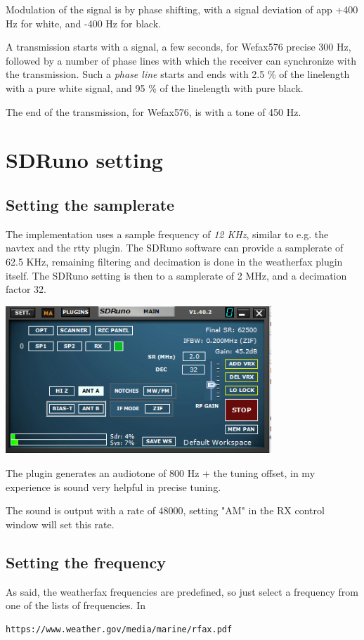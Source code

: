 \documentclass[11pt]{article}
\begin{document}
Modulation of the signal is by phase shifting, with a signal deviation of
app  +400 Hz for white, and -400 Hz for black.

A transmission starts with a signal, a few seconds, for Wefax576
precise 300 Hz,
followed by a number of phase lines with which the receiver can synchronize
with the transmission.
Such a {\em phase line} starts and ends with 2.5 \% of the linelength
with a pure white signal, and 95 \% of the linelength with pure black.

The end of the transmission, for Wefax576, is with a tone of 450 Hz.

\section{SDRuno setting}
\subsection{Setting the samplerate}
The implementation uses a sample frequency of {\em 12 KHz},
similar to e.g. the navtex and the rtty plugin.
The SDRuno software can provide a samplerate
of 62.5 KHz, remaining filtering and decimation is done in
the weatherfax plugin itself.
The SDRuno setting is then to a samplerate of 2 MHz, and a decimation factor
32.

\includegraphics[width=100mm]{main-widget.png}

The plugin generates an audiotone of 800 Hz + the tuning offset, in my
experience is sound very helpful in precise tuning.

The sound is output with a rate of 48000, setting "AM" in the RX control window
will set this rate.

\subsection{Setting the frequency}

As said, the weatherfax frequencies are predefined, so just select
a frequency from one of the lists of frequencies.
In 
\begin{verbatim}
https://www.weather.gov/media/marine/rfax.pdf
\end{verbatim}
\end{document}
